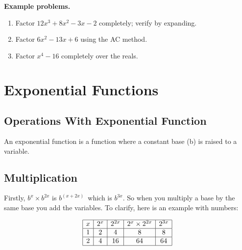 \textbf{Example problems.}
\begin{enumerate}
    \item Factor $12x^3+8x^2-3x-2$ completely; verify by expanding.
    \item Factor $6x^2-13x+6$ using the AC method.
    \item Factor $x^4-16$ completely over the reals.
\end{enumerate}



\section{Exponential Functions}
\label{sec:expo-6c26}



\subsection{Operations With Exponential Function}
\label{sss:oper-9c26}




An exponential function is a function where a constant base (b) is raised to a variable.




\subsection{Multiplication}
\label{sss:mult-98c9}




Firstly, $b^x \times b^{2x}$ is $b^{\left(x + 2x\right)}\,$ which is $b^{3x}$. So when you
multiply a base by the same base you add the variables. To clarify, here is an example
with numbers:



$$\begin{array}{|c|c|c|c|c|} \hline x & 2^x & 2^{2x} & 2^x \times 2^{2x} & 2^{3x} \\ \hline 1 & 2 & 4 & 8 & 8 \\ \hline 2 & 4 & 16 & 64 & 64 \\ \hline \end{array}$$




